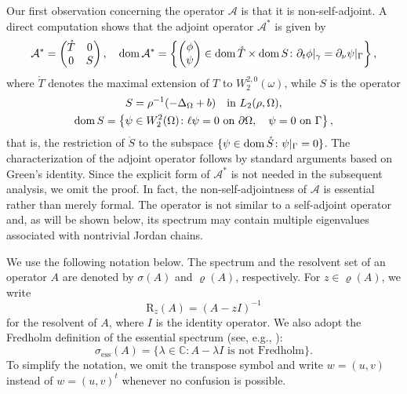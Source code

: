 \documentclass[reqno]{amsart}
\theoremstyle{definition}
\theoremstyle{remark}
\numberwithin{equation}{section}
\newcommand{\dmn}{\mathop{\rm dom}}
\newcommand{\Comp}{\mathbb C}
\newcommand{\cA}{\mathcal{A}}
\newcommand{\rRz}{\mathrm{R}_z}
\begin{document}
Our first observation concerning the operator $\cA$ is that it is non-self-adjoint. A direct computation shows that the adjoint
operator $\cA^*$ is given by
\begin{equation*}
    \cA^*=
    \begin{pmatrix}
        \mathring{T} & 0 \\
        0 & S
    \end{pmatrix},\quad
    \dmn\cA^*=\left\{\begin{pmatrix}
                        \phi\\ \psi
                    \end{pmatrix}\in \dmn \mathring{T}\times\dmn S\colon
             \partial_t \phi|_{\gamma}=\partial_\nu \psi|_\Gamma\right\},
\end{equation*}
where $\mathring{T}$ denotes the maximal extension of $T$ to  $W_2^{2,0}(\omega)$, while $S$ is the operator
\begin{multline}\label{OperatorS}
  S=\rho^{-1}(-\Delta_\Omega+b) \quad\text{in }L_2(\rho,\Omega),\\
  \dmn S=\left\{\psi\in W_2^2(\Omega)\colon \ell\psi=0 \text{ on }\partial\Omega,\quad  \psi=0 \text{ on }\Gamma \right\},
\end{multline} 
that is, the restriction of $\mathring{S}$ to the subspace $\{\psi\in \dmn\mathring{S}\colon \psi|_\Gamma=0\}$. The characterization of the adjoint operator follows by standard arguments based on Green's identity. Since the explicit form of $\cA^*$ is not needed in the subsequent analysis, we omit the proof.
In fact, the non-self-adjointness of $\cA$ is essential rather than merely formal. The operator is not similar to a self-adjoint operator and, as will be
shown below, its spectrum may contain multiple eigenvalues associated with nontrivial Jordan chains.

We use the following notation below. The spectrum and the resolvent set of an operator $A$ are denoted by $\sigma(A)$
and $\varrho(A)$, respectively. For $z\in\varrho(A)$, we write 
\begin{equation*}
\rRz(A)=(A-zI)^{-1}
\end{equation*}
for the resolvent of $A$, where $I$ is the identity operator. We also adopt the Fredholm definition of the essential spectrum (see, e.g., \cite{TretterBook}):
\begin{equation*}
\sigma_{\mathrm{ess}}(A)=\{\lambda\in\Comp\colon A-\lambda I \text{ is not Fredholm}\}.
\end{equation*}
To simplify the notation, we omit the transpose symbol and write $w=(u,v)$ instead of $w=(u,v)^t$  whenever no confusion is possible.
\end{document}
